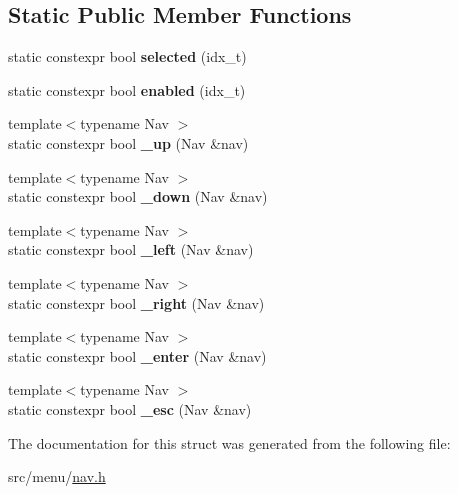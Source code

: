 \subsection*{Static Public Member Functions}
\begin{DoxyCompactItemize}
\item 
\mbox{\label{structDrift_a6260e45ffc337523248c743c214844fc}} 
static constexpr bool {\bfseries selected} (idx\+\_\+t)
\item 
\mbox{\label{structDrift_ab522b977256dd79511c0c4937753a121}} 
static constexpr bool {\bfseries enabled} (idx\+\_\+t)
\item 
\mbox{\label{structDrift_ae224efc028a86e9c3ac9dcedabe0df7a}} 
{\footnotesize template$<$typename Nav $>$ }\\static constexpr bool {\bfseries \+\_\+up} (Nav \&nav)
\item 
\mbox{\label{structDrift_abae8736b1ace13ea08f30e245551f725}} 
{\footnotesize template$<$typename Nav $>$ }\\static constexpr bool {\bfseries \+\_\+down} (Nav \&nav)
\item 
\mbox{\label{structDrift_aae453d31807686fd21326ab90ed32662}} 
{\footnotesize template$<$typename Nav $>$ }\\static constexpr bool {\bfseries \+\_\+left} (Nav \&nav)
\item 
\mbox{\label{structDrift_a69fc62d24473157d5966b178119f31fc}} 
{\footnotesize template$<$typename Nav $>$ }\\static constexpr bool {\bfseries \+\_\+right} (Nav \&nav)
\item 
\mbox{\label{structDrift_a701c7e60548c5b4490cb9662a089d08d}} 
{\footnotesize template$<$typename Nav $>$ }\\static constexpr bool {\bfseries \+\_\+enter} (Nav \&nav)
\item 
\mbox{\label{structDrift_af86c1b134806fbfb3127a6a4ca9e7ea3}} 
{\footnotesize template$<$typename Nav $>$ }\\static constexpr bool {\bfseries \+\_\+esc} (Nav \&nav)
\end{DoxyCompactItemize}


The documentation for this struct was generated from the following file\+:\begin{DoxyCompactItemize}
\item 
src/menu/\hyperlink{nav_8h}{nav.\+h}\end{DoxyCompactItemize}
